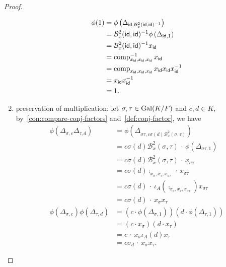 \begin{proof}
\begin{enumerate}
\[\begin{aligned}
            \phi(1)
            &= \phi\left(\Delta_{\mathsf{id},\mathcal{B}^{2}_{x}(\mathsf{id},\mathsf{id})^{-1}}\right) \\
            &= \mathcal{B}^{2}_{x}(\mathsf{id},\mathsf{id})^{-1} \phi\left(\Delta_{\mathsf{id}, 1}\right) \\
            &= \mathcal{B}^{2}_{x}(\mathsf{id},\mathsf{id})^{-1} x_{\mathsf{id}} \\
            &= \operatorname{comp}_{x_{\mathsf{id}},x_{\mathsf{id}},x_{\mathsf{id}}}^{-1} x_{\mathsf{id}} \\
            &= \operatorname{comp}_{x_{\mathsf{id}},x_{\mathsf{id}},x_{\mathsf{id}}} x_{\mathsf{id}} x_{\mathsf{id}} x_{\mathsf{id}}^{-1} \\
            &= x_{\mathsf{id}} x_{\mathsf{id}}^{-1} \\
            &= 1.
          \end{aligned}
          \]
    \item preservation of multiplication: let $\sigma,\tau\in\operatorname{Gal}(K/F)$ and $c,d \in K$, by~\cref{con:compare-conj-factors} and~\cref{def:conj-factor}, we have
          \[
          \begin{aligned}
            \phi\left(\Delta_{\sigma,c}\Delta_{\tau,d}\right)
            &= \phi\left(\Delta_{\sigma\tau, c\sigma(d)\mathcal{B}^{2}_{x}(\sigma,\tau)}\right) \\
            &= c\sigma(d)\mathcal{B}^{2}_{x}(\sigma,\tau) \,\cdot\, \phi\left(\Delta_{\sigma\tau, 1}\right) \\
            &= c\sigma(d)\mathcal{B}^{2}_{x}(\sigma,\tau) \,\cdot\, x_{\sigma\tau} \\
            &= c\sigma(d)\comp_{x_{\sigma},x_{\tau},x_{\sigma\tau}} \,\cdot\, x_{\sigma\tau} \\
            &= c\sigma(d)\,\cdot\, \iota_{A}\left(\comp_{x_{\sigma},x_{\tau},x_{\sigma\tau}}\right)x_{\sigma\tau} \\
            &= c\sigma(d) \,\cdot\, x_{\sigma}x_{\tau}\\
            \phi\left(\Delta_{\sigma,c}\right)\phi\left(\Delta_{\tau,d}\right)
            &=\left(c \cdot \phi\left(\Delta_{\sigma, 1}\right)\right)
              \left(d \cdot \phi\left(\Delta_{\tau, 1}\right)\right) \\
            &= \left(c \cdot x_{\sigma}\right) \left(d \cdot x_{\tau}\right)\\
            &= c \,\cdot\, x_{\sigma}\iota_{A}(d) x_{\tau} \\
            &= c\sigma_{d} \,\cdot\, x_{\sigma}x_{\tau}.
          \end{aligned}
          \]
  \end{enumerate}
\end{proof}

